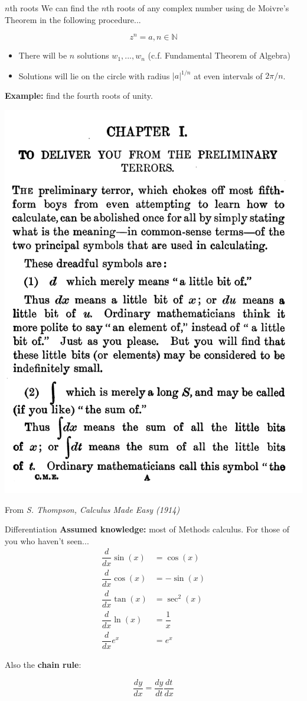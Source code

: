 \documentclass{beamer}
\begin{document}
\begin{frame}{$n$th roots}
	We can find the $n$th roots of any complex number using de Moivre's Theorem in the following procedure...
	
	$$z^n = a, n \in \mathbb{N}$$
	
	\begin{itemize}
		\item There will be $n$ solutions $w_1, ..., w_n$ (c.f. Fundamental Theorem of Algebra)
		\item Solutions will lie on the circle with radius $|a|^{1/n}$ at even intervals of $2\pi/n$.
	\end{itemize}
\end{frame}

\begin{frame}
	\textbf{Example:} find the fourth roots of unity.
	\vspace{5cm}
\end{frame}

\begin{frame}
	\begin{center}
	\includegraphics[width=0.5\linewidth]{img/quote2.png}
	\end{center}
	From \textit{S. Thompson, Calculus Made Easy (1914)}
\end{frame}

\begin{frame}{Differentiation}
	\textbf{Assumed knowledge: } most of Methods calculus. For those of you who haven't seen...
	\begin{align*}
		\dfrac{d}{dx} \sin(x) &= \cos(x)\\
		\dfrac{d}{dx} \cos(x) &= -\sin(x)\\
		\dfrac{d}{dx} \tan(x) &= \sec^2(x)\\
		\dfrac{d}{dx} \ln(x) &= \dfrac{1}{x}\\
		\dfrac{d}{dx} e^x &= e^x
	\end{align*}
	
	Also the \textbf{chain rule}:
	
	$$\dfrac{dy}{dx} = \dfrac{dy}{dt} \dfrac{dt}{dx}$$
	
\end{frame}
\end{document}
